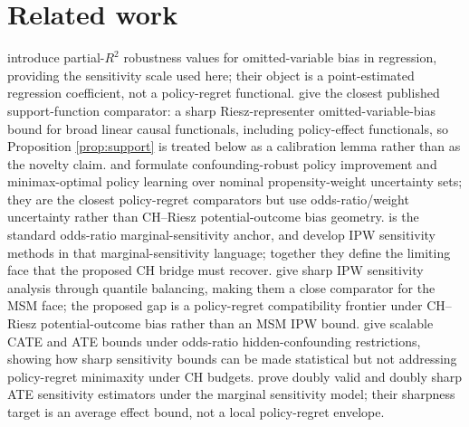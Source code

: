 \documentclass[11pt]{article}
\theoremstyle{definition}
\theoremstyle{plain}
\theoremstyle{remark}
\begin{document}
\section{Related work}
\citet{CinelliHazlett2020} introduce partial-$R^2$ robustness values for omitted-variable bias in regression, providing the sensitivity scale used here; their object is a point-estimated regression coefficient, not a policy-regret functional. \citet{ChernozhukovCinelliNeweySharmaSyrgkanis2022} give the closest published support-function comparator: a sharp Riesz-representer omitted-variable-bias bound for broad linear causal functionals, including policy-effect functionals, so Proposition \ref{prop:support} is treated below as a calibration lemma rather than as the novelty claim. \citet{KallusZhou2018} and \citet{KallusZhou2021} formulate confounding-robust policy improvement and minimax-optimal policy learning over nominal propensity-weight uncertainty sets; they are the closest policy-regret comparators but use odds-ratio/weight uncertainty rather than CH--Riesz potential-outcome bias geometry. \citet{Tan2006} is the standard odds-ratio marginal-sensitivity anchor, and \citet{ZhaoSmallBhattacharya2019} develop IPW sensitivity methods in that marginal-sensitivity language; together they define the limiting face that the proposed CH bridge must recover. \citet{DornGuo2023} give sharp IPW sensitivity analysis through quantile balancing, making them a close comparator for the MSM face; the proposed gap is a policy-regret compatibility frontier under CH--Riesz potential-outcome bias rather than an MSM IPW bound. \citet{YadlowskyNamkoongBasuDuchiTian2022} give scalable CATE and ATE bounds under odds-ratio hidden-confounding restrictions, showing how sharp sensitivity bounds can be made statistical but not addressing policy-regret minimaxity under CH budgets. \citet{DornGuoKallus2025} prove doubly valid and doubly sharp ATE sensitivity estimators under the marginal sensitivity model; their sharpness target is an average effect bound, not a local policy-regret envelope.
\end{document}
